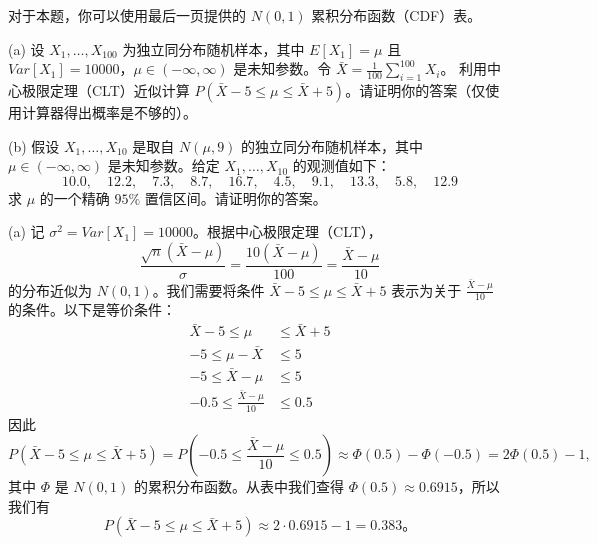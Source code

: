 \begin{questions}
\question
对于本题，你可以使用最后一页提供的 $N(0,1)$ 累积分布函数（CDF）表。

(a) 设 $X_1, \dots, X_{100}$ 为独立同分布随机样本，其中 $E[X_1] = \mu$ 且 $Var[X_1] = 10000$，$\mu \in (-\infty, \infty)$ 是未知参数。令 $\bar{X} = \frac{1}{100} \sum_{i=1}^{100} X_i$。
利用中心极限定理（CLT）近似计算 $P(\bar{X} - 5 \le \mu \le \bar{X} + 5)$。请证明你的答案（仅使用计算器得出概率是不够的）。

(b) 假设 $X_1, \dots, X_{10}$ 是取自 $N(\mu, 9)$ 的独立同分布随机样本，其中 $\mu \in (-\infty, \infty)$ 是未知参数。给定 $X_1, \dots, X_{10}$ 的观测值如下：
\[
10.0, \quad 12.2, \quad 7.3, \quad 8.7, \quad 16.7, \quad 4.5, \quad 9.1, \quad 13.3, \quad 5.8, \quad 12.9
\]
求 $\mu$ 的一个精确 $95\%$ 置信区间。请证明你的答案。

\begin{solution}
(a) 记 $\sigma^2 = Var[X_1] = 10000$。根据中心极限定理（CLT），
\[
\frac{\sqrt{n}(\bar{X} - \mu)}{\sigma} = \frac{10(\bar{X} - \mu)}{100} = \frac{\bar{X} - \mu}{10}
\]
的分布近似为 $N(0,1)$。我们需要将条件 $\bar{X} - 5 \le \mu \le \bar{X} + 5$ 表示为关于 $\frac{\bar{X} - \mu}{10}$ 的条件。以下是等价条件：
\begin{align*}
\bar{X} - 5 \le \mu &\le \bar{X} + 5 \\
-5 \le \mu - \bar{X} &\le 5 \\
-5 \le \bar{X} - \mu &\le 5 \\
-0.5 \le \frac{\bar{X} - \mu}{10} &\le 0.5
\end{align*}
因此
\[
P(\bar{X} - 5 \le \mu \le \bar{X} + 5) = P\left( -0.5 \le \frac{\bar{X} - \mu}{10} \le 0.5 \right) \approx \Phi(0.5) - \Phi(-0.5) = 2\Phi(0.5) - 1,
\]
其中 $\Phi$ 是 $N(0,1)$ 的累积分布函数。从表中我们查得 $\Phi(0.5) \approx 0.6915$，所以我们有
\[
P(\bar{X} - 5 \le \mu \le \bar{X} + 5) \approx 2 \cdot 0.6915 - 1 = 0.383。
\]


\end{solution}
\end{questions}
